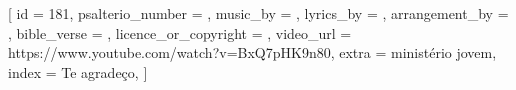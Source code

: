 [
    id                     = {181},
    psalterio_number       = {},
    music_by               = {},
    lyrics_by              = {},
    arrangement_by         = {},
    bible_verse            = {},
    licence_or_copyright   = {},
    video_url              = {https://www.youtube.com/watch?v=BxQ7pHK9n80},
    extra                  = {ministério jovem},
    index                  = {Te agradeço},
]


\beginverse


\endverse


\beginchorus


\endchorus


\beginverse


\endverse



\endsong
